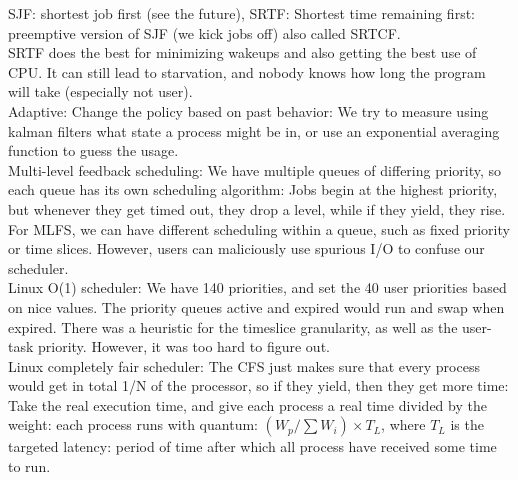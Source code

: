 \documentclass[paper=a4, fontsize=11pt]{scrartcl} %
\numberwithin{equation}{section} %
\numberwithin{figure}{section} %
\numberwithin{table}{section} %
\begin{document}
SJF: shortest job first (see the future), SRTF: Shortest time remaining first: preemptive version of SJF (we kick jobs off) also called SRTCF. \\
SRTF does the best for minimizing wakeups and also getting the best use of CPU. It can still lead to starvation, and nobody knows how long the program will take (especially not user). \\
Adaptive: Change the policy based on past behavior: We try to measure using kalman filters what state a process might be in, or use an exponential averaging function to guess the usage. \\
Multi-level feedback scheduling: We have multiple queues of differing priority, so each queue has its own scheduling algorithm: Jobs begin at the highest priority, but whenever they get timed out, they drop a level, while if they yield, they rise. \\
For MLFS, we can have different scheduling within a queue, such as fixed priority or time slices. However, users can maliciously use spurious I/O to confuse our scheduler. \\
Linux O(1) scheduler: We have 140 priorities, and set the 40 user priorities based on nice values. The priority queues active and expired would run and swap when expired. There was a heuristic for the timeslice granularity, as well as the user-task priority. However, it was too hard to figure out. \\
Linux completely fair scheduler: The CFS just makes sure that every process would get in total 1/N of the processor, so if they yield, then they get more time: Take the real execution time, and give each process a real time divided by the weight: each process runs with quantum: $(W_p/\sum W_i)\times T_L$, where $T_L$ is the targeted latency: period of time after which all process have received some time to run. \\
\end{document}
